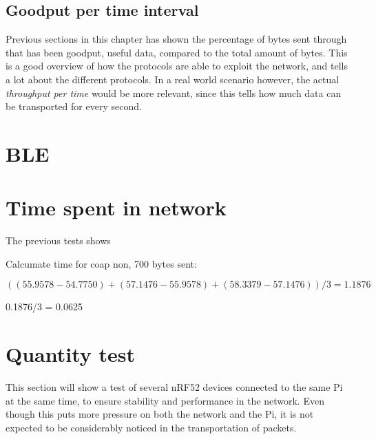\subsection{Goodput per time interval}

Previous sections in this chapter has shown the percentage of bytes sent through that has been goodput, useful data, compared to the total amount of bytes. This is a good overview of how the protocols are able to exploit the network, and tells a lot about the different protocols. In a real world scenario however, the actual \textit{throughput per time} would be more relevant, since this tells how much data can be transported for every second.



\section{BLE}


\section{Time spent in network}

The previous tests shows 



Calcumate time for \gls{coap} \gls{non}, 700 bytes sent:

\begin{equation}
    ((55.9578-54.7750)+(57.1476-55.9578)+(58.3379-57.1476))/3 = 1.1876
\end{equation}

 	0.1876/3 = 0.0625


\section{Quantity test}

This section will show a test of several nRF52 devices connected to the same Pi at the same time, to ensure stability and performance in the network. Even though this puts more pressure on both the network and the Pi, it is not expected to be considerably noticed in the transportation of packets. 



